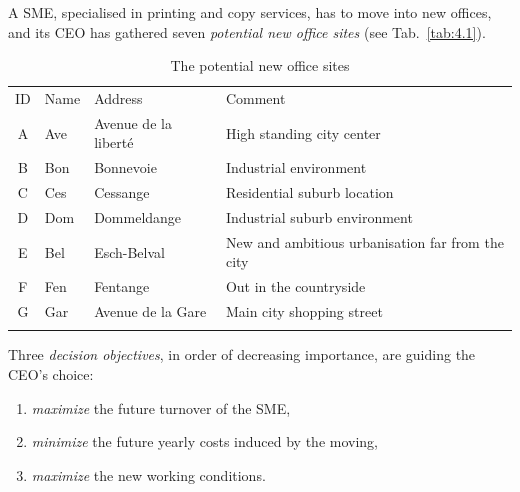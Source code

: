 A SME, specialised in printing and copy services, has to move into new offices, and its CEO has gathered seven \emph{potential new office sites} (see Tab.~\vref{tab:4.1}).
\begin{table}[ht]
\caption{The potential new office sites}
\label{tab:4.1}       %
\begin{center}
    \begin{tabular}{c|l|l|l}
      \svhline\noalign{\smallskip}
      ID & Name & Address & Comment\\
      \noalign{\smallskip}\hline\noalign{\smallskip}
    A &   Ave  &  Avenue de la liberté &  High standing city center\\
    B &   Bon  &  Bonnevoie &             Industrial environment\\
    C &   Ces  &  Cessange &              Residential suburb location\\
    D &   Dom  &  Dommeldange &           Industrial suburb environment\\
    E &   Bel  &  Esch-Belval &           New and ambitious urbanisation far from the city\\
    F &   Fen  &  Fentange &              Out in the countryside\\
      G &   Gar  &  Avenue de la Gare &     Main city shopping street\\
      \noalign{\smallskip}\hline
    \end{tabular}
\end{center}
\end{table}

Three \emph{decision objectives}, in order of decreasing importance, are guiding the CEO's choice:
\begin{enumerate}[leftmargin=1cm]
\item \emph{maximize} the future turnover of the SME,
\item \emph{minimize} the future yearly costs induced by the moving,
\item \emph{maximize} the new working conditions.
\end{enumerate}

